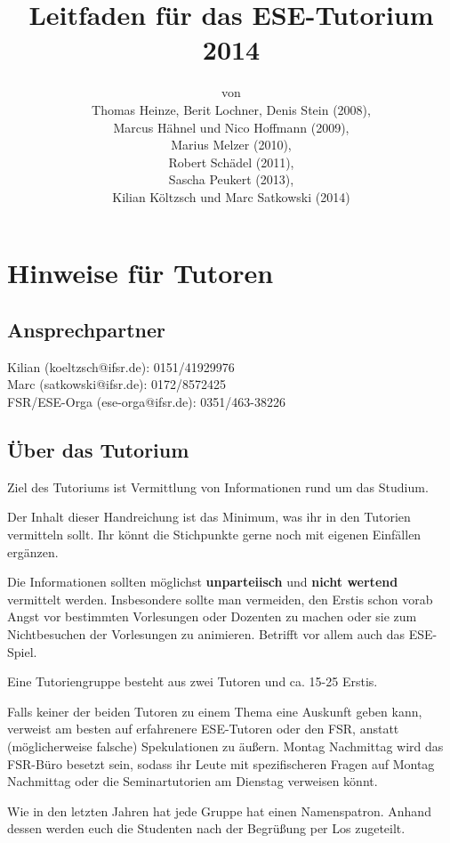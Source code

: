 \documentclass[a4paper,12pt]{report}
\begin{document}
\title{\textbf{Leitfaden für das ESE-Tutorium 2014}\\}
\date{}
\author{von\\Thomas Heinze, Berit Lochner, Denis Stein (2008), \\Marcus Hähnel und Nico Hoffmann (2009), \\Marius Melzer (2010), \\Robert Schädel (2011),\\Sascha Peukert (2013), \\Kilian Költzsch und Marc Satkowski (2014)}
\maketitle

\chapter{Hinweise für Tutoren}
\section{Ansprechpartner}
Kilian (koeltzsch@ifsr.de): 0151/41929976\\
Marc (satkowski@ifsr.de): 0172/8572425 \\
FSR/ESE-Orga (ese-orga@ifsr.de): 0351/463-38226

\section{Über das Tutorium}
\begin{itemize*}
\item Ziel des Tutoriums ist Vermittlung von Informationen rund um das Studium.
\item Der Inhalt dieser Handreichung ist das Minimum, was ihr in den Tutorien vermitteln sollt.
Ihr könnt die Stichpunkte gerne noch mit eigenen Einfällen ergänzen.
\item Die Informationen sollten möglichst \textbf{unparteiisch} und \textbf{nicht wertend} vermittelt werden.
Insbesondere sollte man vermeiden, den Erstis schon vorab Angst vor bestimmten Vorlesungen oder Dozenten zu machen oder sie zum Nichtbesuchen der Vorlesungen zu animieren.
Betrifft vor allem auch das ESE-Spiel.
\item Eine Tutoriengruppe besteht aus zwei Tutoren und ca. 15-25 Erstis.
\item Falls keiner der beiden Tutoren zu einem Thema eine Auskunft geben kann, verweist am besten auf erfahrenere ESE-Tutoren oder den FSR, anstatt (möglicherweise falsche) Spekulationen zu äußern.
Montag Nachmittag wird das FSR-Büro besetzt sein, sodass ihr Leute mit spezifischeren Fragen auf Montag Nachmittag oder die Seminartutorien am Dienstag verweisen könnt.
\item Wie in den letzten Jahren hat jede Gruppe hat einen Namenspatron.
Anhand dessen werden euch die Studenten nach der Begrüßung per Los zugeteilt.
\end{itemize*}
\end{document}
